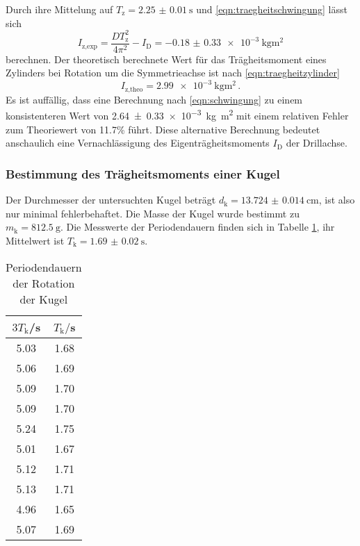 Durch ihre Mittelung auf $T_{\text{z}}=\SI{2.25(001)}{\second}$ und
\eqref{eqn:traegheitschwingung} lässt sich
\begin{equation}
  I_{\text{z,exp}} = \frac{DT_{\text{z}}^2}{4\pi^2}-I_{\text{D}} = \SI{-0.18(033)e-3}{\kilogram\meter\squared}
\end{equation}
berechnen. Der theoretisch berechnete Wert für das Trägheitsmoment eines Zylinders
bei Rotation um die Symmetrieachse ist nach \eqref{eqn:traegheitzylinder}
\begin{equation}
  I_{\text{z,theo}} = \SI{2.99e-3}{\kilogram\meter\squared}\,.
\end{equation}
Es ist auffällig, dass eine Berechnung nach \eqref{eqn:schwingung} zu einem
konsistenteren Wert von \SI{2.64(033)e-3}{\kilogram\meter\squared} mit einem
relativen Fehler zum Theoriewert von 11.7\% führt. Diese alternative Berechnung
bedeutet anschaulich eine Vernachlässigung des Eigenträgheitsmoments $I_{\text{D}}$
der Drillachse.

\subsubsection{Bestimmung des Trägheitsmoments einer Kugel}
Der Durchmesser der untersuchten Kugel beträgt $d_{\text{k}}=\SI{13.724(0014)}{\cm}$,
ist also nur minimal fehlerbehaftet. Die Masse der Kugel wurde bestimmt zu
$m_{\text{k}}=\SI{812.5}{\gram}$. Die Messwerte der Periodendauern finden sich
in Tabelle \ref{tab:kugel}, ihr Mittelwert ist $T_{\text{k}}=\SI{1.69(002)}{\second}$.

\begin{table}
\centering
\caption{Periodendauern der Rotation der Kugel}
\label{tab:kugel}
\begin{tabular}{c c}
\toprule
$3T_{\text{k}}$/s & $T_{\text{k}}/$s \\
\midrule
5.03 & 1.68 \\
5.06 & 1.69 \\
5.09 & 1.70 \\
5.09 & 1.70 \\
5.24 & 1.75 \\
5.01 & 1.67 \\
5.12 & 1.71 \\
5.13 & 1.71 \\
4.96 & 1.65 \\
5.07 & 1.69 \\
\bottomrule
\end{tabular}
\end{table}

